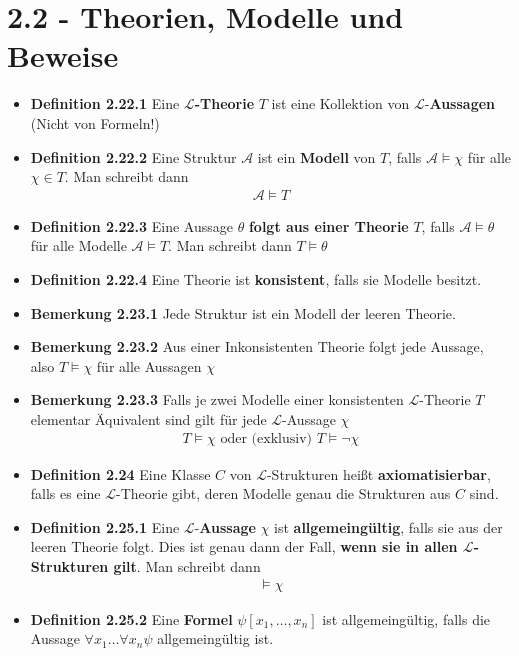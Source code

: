 \documentclass{scrartcl}
\renewcommand{\models}[0]{\vDash}
\begin{document}
\section*{2.2 - Theorien, Modelle und Beweise}
\begin{itemize}
    \item \textbf{Definition 2.22.1} Eine \textbf{$\mathcal{L}$-Theorie} $T$ ist eine Kollektion von $\mathcal{L}$-\textbf{Aussagen} (Nicht von Formeln!)
    \item \textbf{Definition 2.22.2} Eine Struktur $\mathcal{A}$ ist ein \textbf{Modell} von $T$, falls $\mathcal{A} \models \chi$ für alle $\chi \in T$. Man schreibt dann 
    \begin{align*}
        \mathcal{A} \models T
    \end{align*}
    \item \textbf{Definition 2.22.3} Eine Aussage $\theta$ \textbf{folgt aus einer Theorie} $T$, falls $\mathcal{A} \models \theta$ für alle Modelle $\mathcal A \models T$. Man schreibt dann $T \models \theta$
    \item \textbf{Definition 2.22.4} Eine Theorie ist \textbf{konsistent}, falls sie Modelle besitzt.
    \item \textbf{Bemerkung 2.23.1} Jede Struktur ist ein Modell der leeren Theorie.
    \item \textbf{Bemerkung 2.23.2} Aus einer Inkonsistenten Theorie folgt jede Aussage,
    also $T \models \chi$ für alle Aussagen $\chi$
    \item \textbf{Bemerkung 2.23.3} Falls je zwei Modelle einer konsistenten $\mathcal{L}$-Theorie $T$ elementar Äquivalent sind gilt für jede $\mathcal{L}$-Aussage $\chi$
    \begin{align*}
        T \models \chi \text{ oder (exklusiv) } T \models \neg \chi
    \end{align*}
    \item \textbf{Definition 2.24} Eine Klasse $C$ von $\mathcal{L}$-Strukturen heißt \textbf{axiomatisierbar}, falls es eine $\mathcal{L}$-Theorie gibt, deren Modelle genau die Strukturen aus $C$ sind.
    \item \textbf{Definition 2.25.1} Eine $\mathcal{L}$-\textbf{Aussage} $\chi$ ist \textbf{allgemeingültig}, falls sie aus der leeren Theorie folgt. Dies ist genau dann der Fall, \textbf{wenn sie in allen $\mathcal{L}$-Strukturen gilt}. Man schreibt dann
    \begin{align*}
        \models \chi
    \end{align*}
    \item \textbf{Definition 2.25.2} Eine \textbf{Formel} $\psi[x_1, \hdots, x_n]$ ist allgemeingültig, falls die Aussage $\forall x_1 \hdots \forall x_n \psi$ allgemeingültig ist. 

\end{itemize}
\end{document}
